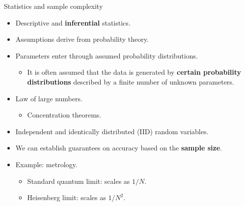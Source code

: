 \documentclass[compress]{beamer}\usetheme{Warsaw}\usecolortheme{crane}\useoutertheme[subsection=false]{smoothbars}
\begin{document}
\begin{frame}{Statistics and sample complexity}
  \begin{itemize}
	  \item Descriptive and \textbf{inferential} statistics.
    \item Assumptions derive from probability theory.
    \item Parameters enter through assumed probability distributions.
    \begin{itemize}
      \item It is often assumed that the data is generated by \textbf{certain probability distributions} described by a finite number of unknown parameters.
    \end{itemize}
	  \item Law of large numbers.
    \begin{itemize}
       \item Concentration theorems.
    \end{itemize}
    \item Independent and identically distributed (IID) random variables.
    \item We can establish guarantees on accuracy based on the \textbf{sample size}.
    \item Example: metrology.
    \begin{itemize}
      \item Standard quantum limit: scales as $1/N$.
      \item Heisenberg limit: scales as $1/N^2$.
    \end{itemize}
  \end{itemize}
\end{frame}
\end{document}
